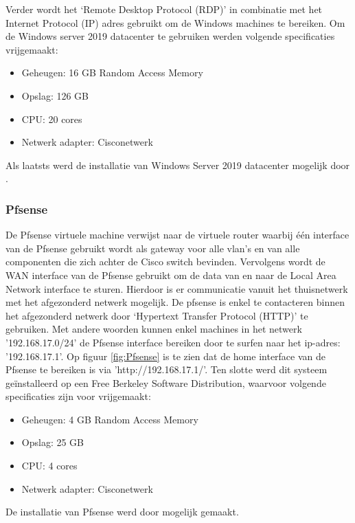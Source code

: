 Verder wordt het ‘Remote Desktop Protocol (RDP)’ in combinatie met het Internet Protocol (IP) adres gebruikt om de Windows machines te bereiken.
\newline
\newline
Om de Windows server 2019 datacenter te gebruiken werden volgende specificaties vrijgemaakt:

\begin{itemize}
	\item Geheugen: 16 GB Random Access Memory
	\item Opslag: 126 GB
	\item CPU: 20 cores
	\item Netwerk adapter: Cisco\textunderscore netwerk
\end{itemize}

Als laatsts werd de installatie van Windows Server 2019 datacenter mogelijk door \cite{Win19_InstallationGuide}. 

\subsubsection{Pfsense}
De Pfsense virtuele machine verwijst naar de virtuele router waarbij één interface van de Pfsense gebruikt wordt als gateway voor alle vlan’s en van alle componenten die zich achter de Cisco switch bevinden. Vervolgens wordt de WAN interface van de Pfsense gebruikt om de data van en naar de Local Area Network interface te sturen. Hierdoor is er communicatie vanuit het thuisnetwerk met het afgezonderd netwerk mogelijk.
\newline
\newline
De pfsense is enkel te contacteren binnen het afgezonderd netwerk door ‘Hypertext Transfer Protocol (HTTP)’ te gebruiken. Met andere woorden kunnen enkel machines in het netwerk '192.168.17.0/24' de Pfsense interface bereiken door te surfen naar het ip-adres: '192.168.17.1'. Op figuur \ref{fig:Pfsense} is te zien dat de home interface van de Pfsense te bereiken is via 'http://192.168.17.1/'.
\newline
\newline
Ten slotte werd dit systeem geïnstalleerd op een Free Berkeley Software Distribution, waarvoor volgende specificaties zijn voor vrijgemaakt:  

\begin{itemize}
	\item Geheugen: 4 GB Random Access Memory
	\item Opslag: 25 GB
	\item CPU: 4 cores
	\item Netwerk adapter: Cisco\textunderscore netwerk
\end{itemize}
De installatie van Pfsense werd door \cite{Pfsense_InstallationGuide} mogelijk gemaakt.

